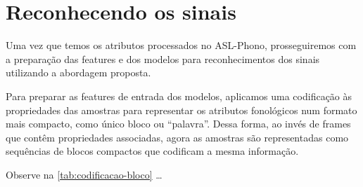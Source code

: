\section{Reconhecendo os sinais}
\label{sec:metodologia-reconhecimento}

Uma vez que temos os atributos processados no ASL-Phono, prosseguiremos com a preparação das features e dos modelos para reconhecimentos dos sinais utilizando a abordagem proposta.

Para preparar as features de entrada dos modelos, aplicamos uma codificação às propriedades das amostras para representar os atributos fonológicos num formato mais compacto, como único bloco ou ``palavra''. Dessa forma, ao invés de frames que contêm propriedades associadas, agora as amostras são representadas como sequências de blocos compactos que codificam a mesma informação.

Observe na \autoref{tab:codificacao-bloco} \dots



